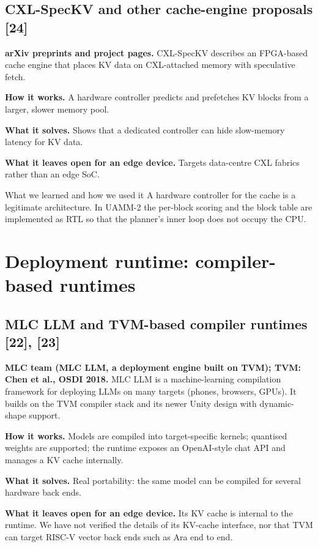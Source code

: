 \documentclass[12pt,a4paper]{report}
\begin{document}
\subsection{CXL-SpecKV and other cache-engine proposals [24]}
\textbf{arXiv preprints and project pages.} CXL-SpecKV describes an FPGA-based cache engine that places KV data on CXL-attached memory with speculative fetch.

\textbf{How it works.} A hardware controller predicts and prefetches KV blocks from a larger, slower memory pool.

\textbf{What it solves.} Shows that a dedicated controller can hide slow-memory latency for KV data.

\textbf{What it leaves open for an edge device.} Targets data-centre CXL fabrics rather than an edge SoC.

\begin{calloutbox}{What we learned and how we used it}
A hardware controller for the cache is a legitimate architecture. In UAMM-2 the per-block scoring and the block table are implemented as RTL so that the planner's inner loop does not occupy the CPU.

\end{calloutbox}
\section{Deployment runtime: compiler-based runtimes}\label{sec:2_11}
\subsection{MLC LLM and TVM-based compiler runtimes [22], [23]}
\textbf{MLC team (MLC LLM, a deployment engine built on TVM); TVM: Chen et al., OSDI 2018.} MLC LLM is a machine-learning compilation framework for deploying LLMs on many targets (phones, browsers, GPUs). It builds on the TVM compiler stack and its newer Unity design with dynamic-shape support.

\textbf{How it works.} Models are compiled into target-specific kernels; quantised weights are supported; the runtime exposes an OpenAI-style chat API and manages a KV cache internally.

\textbf{What it solves.} Real portability: the same model can be compiled for several hardware back ends.

\textbf{What it leaves open for an edge device.} Its KV cache is internal to the runtime. We have not verified the details of its KV-cache interface, nor that TVM can target RISC-V vector back ends such as Ara end to end.
\end{document}
